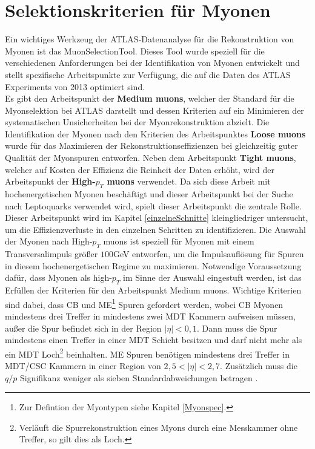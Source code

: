 \section{Selektionskriterien für Myonen}\label{Selektionskriterien}
Ein wichtiges Werkzeug der ATLAS-Datenanalyse für die Rekonstruktion von Myonen ist das MuonSelectionTool. Dieses Tool wurde speziell für die verschiedenen Anforderungen bei der Identifikation von Myonen entwickelt und stellt spezifische Arbeitspunkte zur Verfügung, die auf die Daten des ATLAS Experiments von 2013 optimiert sind.\\ 
Es gibt den Arbeitspunkt der \textbf{Medium muons}, welcher der Standard für die Myonselektion bei ATLAS darstellt und dessen Kriterien auf ein Minimieren der systematischen Unsicherheiten bei der Myonrekonstruktion abzielt. Die Identifikation der Myonen nach den Kriterien des Arbeitspunktes \textbf{Loose muons} wurde für das Maximieren der Rekonstruktionseffizienzen bei gleichzeitig guter Qualität der Myonspuren entworfen. Neben dem Arbeitspunkt \textbf{Tight muons}, welcher auf Kosten der Effizienz die Reinheit der Daten erhöht, wird der Arbeitspunkt der \textbf{High-$p_{T}$ muons} verwendet. Da sich diese Arbeit mit hochenergetischen Myonen beschäftigt und dieser Arbeitspunkt bei der Suche nach Leptoquarks verwendet wird, spielt dieser Arbeitspunkt die zentrale Rolle. Dieser Arbeitspunkt wird im Kapitel \ref{einzelneSchnitte} kleingliedriger untersucht, um die Effizienzverluste in den einzelnen Schritten zu identifizieren. Die Auswahl der Myonen nach High-$p_{T}$ muons ist speziell für Myonen mit einem Transversalimpuls größer $100$GeV entworfen, um die Impulsauflösung für Spuren in diesem hochenergetischen Regime zu maximieren. Notwendige Voraussetz\-ung dafür, dass Myonen als high-$p_{T}$ im Sinne der Auswahl eingestuft werden, ist das Erfüllen der Kriterien für den Arbeitspunkt Medium muons. Wichtige Krite\-rien sind dabei, dass CB und ME\footnote{Zur Defintion der Myontypen siehe Kapitel \ref{Myonspec}.} Spuren gefordert werden, wobei CB Myonen mindestens drei Treffer in mindestens zwei MDT Kammern aufweisen müssen, außer die Spur befindet sich in der Region $|\eta|<0{,}1$. Dann muss die Spur mindestens einen Treffer in einer MDT Schicht besitzen und darf nicht mehr als ein MDT Loch\footnote{Verläuft die Spurrekonstruktion eines Myons durch eine Messkammer ohne Treffer, so gilt dies als Loch.} beinhalten. ME Spuren benötigen mindestens drei Treffer in MDT/CSC Kammern in einer Region von $2{,}5<|\eta|<2{,}7$. Zusätzlich muss die $q/p$ Signifikanz weniger als sieben Standardabweichungen betragen \cite{MuPerNeu}.\\
